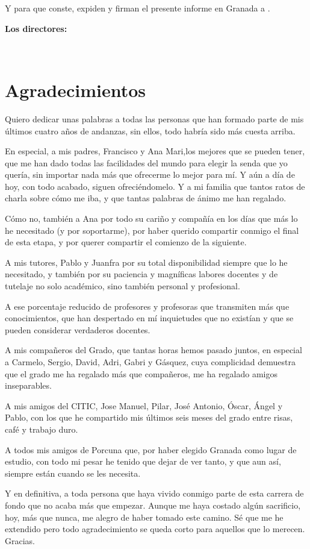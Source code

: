 \vspace{0.5cm}

Y para que conste, expiden y firman el presente informe en Granada a \myTime.

\vspace{1cm}

\textbf{Los directores:}

\vspace{5cm}

\noindent \textbf{\myProf} \ \ \ \ \ \textbf{\myOtherProf}

\chapter*{Agradecimientos}
\thispagestyle{empty}

       \vspace{1cm}


Quiero dedicar unas palabras a todas las personas que han formado parte de mis últimos cuatro años de andanzas, sin ellos, todo habría sido más cuesta arriba.

En especial, a mis padres, Francisco y Ana Mari,los mejores que se pueden tener, que me han dado todas las facilidades del mundo para elegir la senda que yo quería, sin importar nada más que ofrecerme lo mejor para mí. Y aún a día de hoy, con todo acabado, siguen ofreciéndomelo. Y a mi familia que tantos ratos de charla sobre cómo me iba, y que tantas palabras de ánimo me han regalado.

Cómo no, también a Ana por todo su cariño y compañía en los días que más lo he necesitado (y por soportarme), por haber querido compartir conmigo el final de esta etapa, y por querer compartir el comienzo de la siguiente.

A mis tutores, Pablo y Juanfra por su total disponibilidad siempre que lo he necesitado, y también por su paciencia y magníficas labores docentes y de tutelaje no solo académico, sino también personal y profesional. 

A ese porcentaje reducido de profesores y profesoras que transmiten más que conocimientos, que han despertado en mí inquietudes que no existían y que se pueden considerar verdaderos docentes.

A mis compañeros del Grado, que tantas horas hemos pasado juntos, en especial a Carmelo, Sergio, David, Adri, Gabri y Gásquez, cuya complicidad demuestra que el grado me ha regalado más que compañeros, me ha regalado amigos inseparables.

A mis amigos del CITIC, Jose Manuel, Pilar, José Antonio, Óscar, Ángel y Pablo, con los que he compartido mis últimos seis meses del grado entre risas, café y trabajo duro.

A todos mis amigos de Porcuna que, por haber elegido Granada como lugar de estudio, con todo mi pesar he tenido que dejar de ver tanto, y que aun así, siempre están cuando se les necesita.

Y en definitiva, a toda persona que haya vivido conmigo parte de esta carrera de fondo que no acaba más que empezar. Aunque me haya costado algún sacrificio, hoy, más que nunca, me alegro de haber tomado este camino. Sé que me he extendido pero todo agradecimiento se queda corto para aquellos que lo merecen. Gracias.